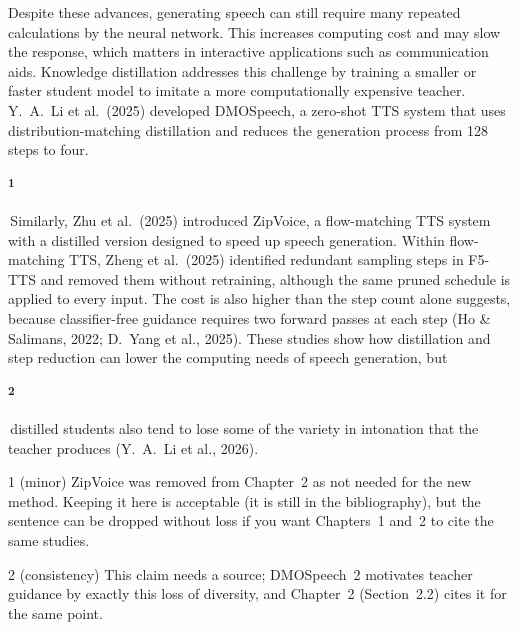 \documentclass[11pt,a4paper]{article}
\newcommand{\add}[1]{{\color{addcol}#1}}
\newcommand{\flag}[2]{\colorbox{flagcol}{\strut\textsuperscript{\bfseries #1}}\,{#2}}
\newcounter{cmt}
\begin{document}
Despite these advances, generating speech can still require many repeated calculations by the neural network. This increases computing cost and may slow the response, which matters in interactive applications such as communication aids. Knowledge distillation addresses this challenge by training a smaller or faster student model to imitate a more computationally expensive teacher. Y.\ A.\ Li et al.\ (2025) developed DMOSpeech, a zero-shot TTS system that uses distribution-matching distillation and reduces the generation process from 128 steps to four. \flag{1}{Similarly, Zhu et al.\ (2025) introduced ZipVoice, a flow-matching TTS system with a distilled version designed to speed up speech generation.} Within flow-matching TTS, Zheng et al.\ (2025) identified redundant sampling steps in F5-TTS and removed them without retraining, although the same pruned schedule is applied to every input. The cost is also higher than the step count alone suggests, because classifier-free guidance requires two forward passes at each step (Ho \& Salimans, 2022; D.\ Yang et al., 2025). These studies show how distillation and step reduction can lower the computing needs of speech generation, but \flag{2}{distilled students also tend to lose some of the variety in intonation that the teacher produces}\add{ (Y.\ A.\ Li et al., 2026)}.

\begin{cmt}{1 (minor)}
ZipVoice was removed from Chapter~2 as not needed for the new method. Keeping it here is acceptable (it is still in the bibliography), but the sentence can be dropped without loss if you want Chapters~1 and~2 to cite the same studies.
\end{cmt}
\begin{cmt}{2 (consistency)}
This claim needs a source; DMOSpeech~2 motivates teacher guidance by exactly this loss of diversity, and Chapter~2 (Section~2.2) cites it for the same point.
\end{cmt}
\end{document}
